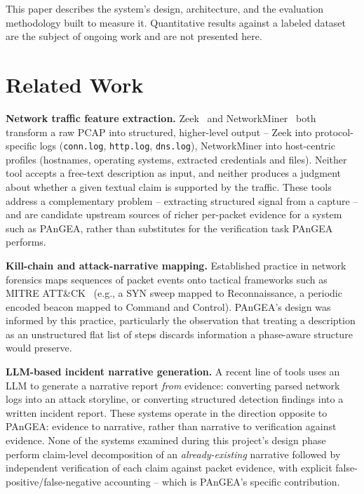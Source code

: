 \documentclass[sigconf,nonacm]{acmart}
\begin{document}
This paper describes the system's design, architecture, and the evaluation
methodology built to measure it. Quantitative results against a labeled dataset
are the subject of ongoing work and are not presented here.

\section{Related Work}

\textbf{Network traffic feature extraction.} Zeek~\cite{zeek} and
NetworkMiner~\cite{networkminer} both transform a raw PCAP into structured,
higher-level output -- Zeek into protocol-specific logs (\texttt{conn.log},
\texttt{http.log}, \texttt{dns.log}), NetworkMiner into host-centric profiles
(hostnames, operating systems, extracted credentials and files). Neither tool
accepts a free-text description as input, and neither produces a judgment about
whether a given textual claim is supported by the traffic. These tools address
a complementary problem -- extracting structured signal from a capture -- and
are candidate upstream sources of richer per-packet evidence for a system such
as PAnGEA, rather than substitutes for the verification task PAnGEA performs.

\textbf{Kill-chain and attack-narrative mapping.} Established practice in
network forensics maps sequences of packet events onto tactical frameworks such
as MITRE ATT\&CK~\cite{mitre_attack} (e.g., a SYN sweep mapped to
Reconnaissance, a periodic encoded beacon mapped to Command and Control).
PAnGEA's design was informed by this practice, particularly the observation
that treating a description as an unstructured flat list of steps discards
information a phase-aware structure would preserve.

\textbf{LLM-based incident narrative generation.} A recent line of tools uses
an LLM to generate a narrative report \emph{from} evidence: converting parsed
network logs into an attack storyline, or converting structured detection
findings into a written incident report. These systems operate in the direction
opposite to PAnGEA: evidence to narrative, rather than narrative to
verification against evidence. None of the systems examined during this
project's design phase perform claim-level decomposition of an
\emph{already-existing} narrative followed by independent verification of each
claim against packet evidence, with explicit false-positive/false-negative
accounting -- which is PAnGEA's specific contribution.
\end{document}
